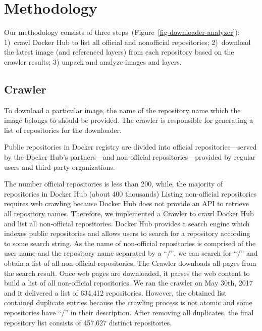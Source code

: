 \section{Methodology}
\label{sec:methodology}


Our methodology consists of three steps~(Figure~\ref{fig-downloader-analyzer}):
1)~crawl Docker Hub to list all official and nonofficial repositories;
2)~download the latest image (and referenced layers) from each repository based
on the crawler results; 3) unpack and analyze images and layers.



\subsection{Crawler}
\label{sec:crawler}
%
To download a particular image, %
the name of the repository name which the image belongs to should be provided.
The crawler is responsible
for generating a list of repositories for the downloader.

Public repositories in Docker registry are divided into official
repositories---served by the Docker Hub's partners---and non-official
repositories---provided
by regular users and third-party organizations.

The number official repositories is less than 200,
while, the majority
of repositories in Docker Hub (about 400 thousands)
Listing non-official repositories requires web crawling because
Docker Hub does not provide an API to retrieve all repository names.
Therefore, we implemented a Crawler to crawl Docker Hub and list all non-official
repositories.
Docker Hub provides a search engine which indexes public repositories and allows
users to search for a repository according to
some search string. 
%
As the name of non-official repositories is comprised
of the user name and the repository name separated by a ``/'',
we can search for ``/'' and obtain a list of all non-official
repositories.
The Crawler downloads all pages from the search result.
Once web pages are downloaded, it parses the web content to build a list of
all non-official repositories.
We ran the crawler on May 30th, 2017 and it delivered a list of 634,412 repositories.
%
However, the obtained list contained duplicate entries because 
the crawling process is not atomic and some repositories have ``/'' in their description.
%
After removing all duplicates, the final repository list consists of 457,627
distinct repositories. 

